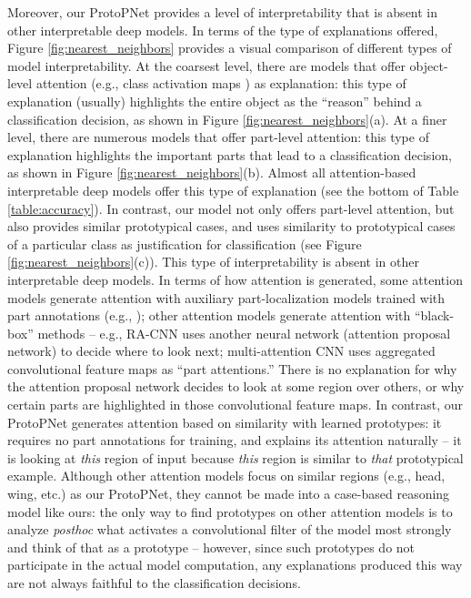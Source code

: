 \documentclass[conference]{IEEEtran}
\begin{document}
Moreover, our ProtoPNet provides a level of interpretability that is absent in other interpretable deep models. In terms of the type of explanations offered, Figure \ref{fig:nearest_neighbors} provides a visual comparison of different types of model interpretability. At the coarsest level, there are models that offer object-level attention (e.g., class activation maps \cite{b11}) as explanation: this type of explanation (usually) highlights the entire object as the ``reason'' behind a classification decision, as shown in Figure \ref{fig:nearest_neighbors}(a). At a finer level, there are numerous models that offer part-level attention: this type of explanation highlights the important parts that lead to a classification decision, as shown in Figure \ref{fig:nearest_neighbors}(b). Almost all attention-based interpretable deep models offer this type of explanation (see the bottom of Table \ref{table:accuracy}). In contrast, our model not only offers part-level attention, but also provides similar prototypical cases, and uses similarity to prototypical cases of a particular class as justification for classification (see Figure \ref{fig:nearest_neighbors}(c)). This type of interpretability is absent in other interpretable deep models. In terms of how attention is generated, some attention models generate attention with auxiliary part-localization models trained with part annotations (e.g., \cite{b12,b13,b14,b15,b16}); other attention models generate attention with ``black-box'' methods -- e.g., RA-CNN \cite{b17} uses another neural network (attention proposal network) to decide where to look next; multi-attention CNN \cite{b18} uses aggregated convolutional feature maps as ``part attentions.'' There is no explanation for why the attention proposal network decides to look at some region over others, or why certain parts are highlighted in those convolutional feature maps. In contrast, our ProtoPNet generates attention based on similarity with learned prototypes: it requires no part annotations for training, and explains its attention naturally -- it is looking at \textit{this} region of input because \textit{this} region is similar to \textit{that} prototypical example. Although other attention models focus on similar regions (e.g., head, wing, etc.) as our ProtoPNet, they cannot be made into a case-based reasoning model like ours: the only way to find prototypes on other attention models is to analyze \textit{posthoc} what activates a convolutional filter of the model most strongly and think of that as a prototype -- however, since such prototypes do not participate in the actual model computation, any explanations produced this way are not always faithful to the classification decisions.
\end{document}
